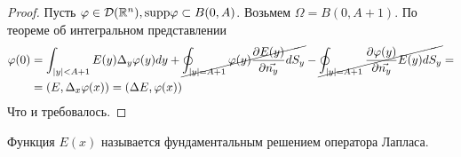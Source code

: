 \begin{proof}
Пусть $\varphi \in \mathcal{D}(\mathbb{R}^n), \mathrm{supp} \varphi \subset B(0, A)$. Возьмем $\Omega = B(0, A +1)$. По теореме об интегральном представлении
\begin{align*}
\varphi(0) &= \int_{|y| < A +1} E(y) \Delta_y \varphi(y) dy + \cancel{\oint_{|y| = A+1} \varphi(y)\dfrac{\partial E(y)}{\partial \vec{n_y}} dS_y} - \cancel{\oint_{|y| = A+1} \dfrac{\partial \varphi(y)}{\partial \vec{n_y}} E(y)dS_y} = \\
&= (E, \Delta_x \varphi(x)) = (\Delta E, \varphi(x))
\end{align*}
Что и требовалось.
\end{proof}
\begin{definition}
Функция $E(x)$ называется фундаментальным решением оператора Лапласа.
\end{definition}